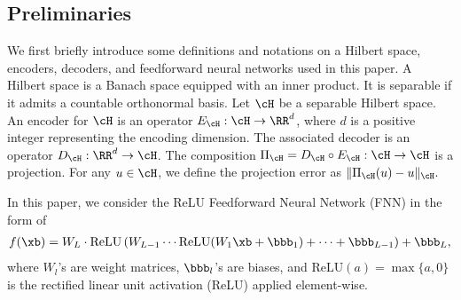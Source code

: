 \documentclass[11pt]{article} %
\newcommand{\ReLU}{\mathrm{ReLU}}
\newcommand{\hao}[1]{{\color{blue} #1}}
\begin{document}
\subsection{Preliminaries}
We first briefly introduce some definitions and notations on a Hilbert space, encoders, decoders, and feedforward neural networks used in this paper. %
A Hilbert space is a Banach space equipped with an inner product. It is separable if it admits a countable orthonormal basis. Let $\cH$ be a separable Hilbert space. An encoder for $\cH$ is an operator $E_{\cH}: \cH\rightarrow \RR^d$, where $d$ is a positive integer representing the encoding dimension. The associated decoder is an operator  $D_{\cH}:\RR^d \rightarrow \cH$. The composition $\Pi_{\cH}=D_{\cH}\circ E_{\cH}: \cH\rightarrow \cH$ is a projection. For any $u\in \cH$, we define the projection error as $
\|\Pi_{\cH}(u)-u\|_{\cH}.$





In this paper, we consider  the ReLU Feedforward Neural Network (FNN) in the form of
\begin{align}
	f(\xb)=W_L\cdot\ReLU\left( W_{L-1}\cdots \ReLU(W_1\xb+\bbb_1)+ \cdots +\bbb_{L-1}\right)+\bbb_L,
	\label{eq.FNN.f}
\end{align}
where $W_l$'s are weight matrices, $\bbb_l$'s are biases, and $\ReLU(a)=\max\{a,0\}$ is the rectified linear unit activation (ReLU) applied element-wise.
\end{document}
